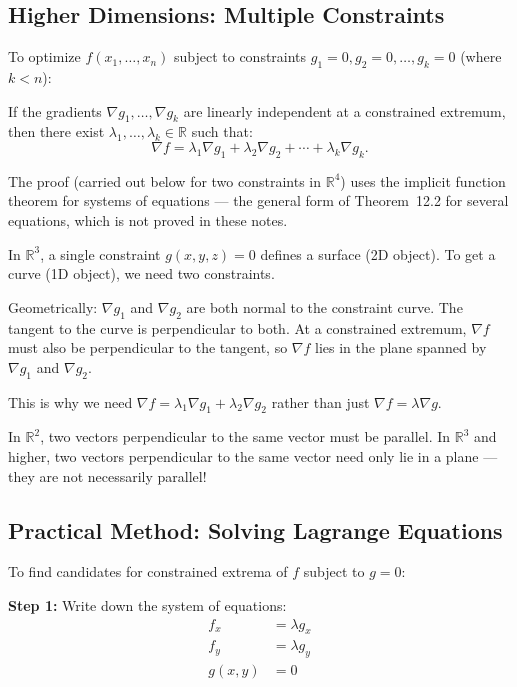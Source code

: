 \documentclass[11pt]{report}
\newcommand{\R}{\mathbb{R}}
\begin{document}
\subsection{Higher Dimensions: Multiple Constraints}

\begin{theorem}
To optimize $f(x_1, \ldots, x_n)$ subject to constraints $g_1 = 0, g_2 = 0, \ldots, g_k = 0$ (where $k < n$):

If the gradients $\nabla g_1, \ldots, \nabla g_k$ are linearly independent at a constrained extremum, then there exist $\lambda_1, \ldots, \lambda_k \in \R$ such that:
\[
\nabla f = \lambda_1 \nabla g_1 + \lambda_2 \nabla g_2 + \cdots + \lambda_k \nabla g_k.
\]
\end{theorem}

The proof (carried out below for two constraints in $\R^4$) uses the implicit function theorem for systems of equations --- the general form of Theorem~12.2 for several equations, which is not proved in these notes.

\begin{remark}
In $\R^3$, a single constraint $g(x, y, z) = 0$ defines a surface (2D object). To get a curve (1D object), we need two constraints.

Geometrically: $\nabla g_1$ and $\nabla g_2$ are both normal to the constraint curve. The tangent to the curve is perpendicular to both. At a constrained extremum, $\nabla f$ must also be perpendicular to the tangent, so $\nabla f$ lies in the plane spanned by $\nabla g_1$ and $\nabla g_2$.

This is why we need $\nabla f = \lambda_1 \nabla g_1 + \lambda_2 \nabla g_2$ rather than just $\nabla f = \lambda \nabla g$.

In $\R^2$, two vectors perpendicular to the same vector must be parallel. In $\R^3$ and higher, two vectors perpendicular to the same vector need only lie in a plane --- they are not necessarily parallel!
\end{remark}

\subsection*{Practical Method: Solving Lagrange Equations}

To find candidates for constrained extrema of $f$ subject to $g = 0$:

\textbf{Step 1:} Write down the system of equations:
\begin{align*}
f_x &= \lambda g_x \\
f_y &= \lambda g_y \\
g(x, y) &= 0
\end{align*}
\end{document}
